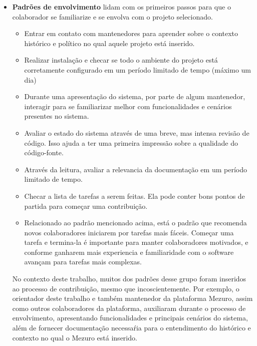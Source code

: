 \begin{itemize}
\item \textbf{Padrões de envolvimento} lidam com os primeiros passos para que o colaborador se familiarize e se envolva com o projeto selecionado.
	\begin{itemize}
	\item Entrar em contato com mantenedores para aprender sobre o contexto histórico e político no qual aquele projeto está inserido.
	\item Realizar instalação e checar se todo o ambiente do projeto está corretamente configurado em um período limitado de tempo (máximo um dia)
	\item Durante uma apresentação do sistema,  por parte de algum mantenedor, interagir para se familiarizar melhor com funcionalidades e cenários presentes no sistema.
	\item Avaliar o estado do sistema através de uma breve, mas intensa revisão de código. Isso ajuda a ter uma primeira impressão sobre a qualidade do código-fonte.
	\item Através da leitura, avaliar a relevancia da documentação em um período limitado de tempo.
	\item Checar a lista de tarefas a serem feitas. Ela pode conter bons pontos de partida para começar uma contribuição.
	\item Relacionado ao padrão mencionado acima, está o padrão que recomenda novos colaboradores iniciarem por tarefas mais fáceis. Começar uma tarefa e termina-la é importante para manter colaboradores motivados, e conforme ganharem mais experiencia e familiaridade com o software avançam para tarefas mais complexas.
	\end{itemize}
	No contexto deste trabalho, muitos dos padrões desse grupo foram inseridos ao processo de contribuição, mesmo que incoscientemente. Por exemplo, o orientador deste trabalho e também mantenedor da plataforma Mezuro, assim como outros colaboradores da plataforma, auxiliaram durante o processo de envolvimento, apresentando funcionalidades e principais cenários do sistema, além de fornecer documentação necessaŕia para o entendimento do histórico e contexto no qual o Mezuro está inserido.
	

\end{itemize}
